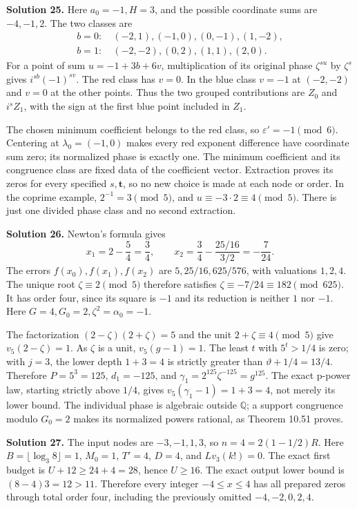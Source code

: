 \documentclass[
  11pt,
  a4paper,
]{article}
\begin{document}
\textbf{Solution 25.} Here \(a_0=-1,H=3\), and the possible coordinate
sums are \(-4,-1,2\). The two classes are \[
\begin{aligned}
b=0:\ &(-2,1),(-1,0),(0,-1),(1,-2),\\
b=1:\ &(-2,-2),(0,2),(1,1),(2,0).
\end{aligned}
\] For a point of sum \(u=-1+3b+6v\), multiplication of its original
phase \(\zeta^{su}\) by \(\zeta^s\) gives \(i^{sb}(-1)^{sv}\). The red
class has \(v=0\). In the blue class \(v=-1\) at \((-2,-2)\) and \(v=0\)
at the other points. Thus the two grouped contributions are \(Z_0\) and
\(i^sZ_1\), with the sign at the first blue point included in \(Z_1\).

The chosen minimum coefficient belongs to the red class, so
\(\varepsilon'=-1\pmod6\). Centering at \(\lambda_0=(-1,0)\) makes every
red exponent difference have coordinate sum zero; its normalized phase
is exactly one. The minimum coefficient and its congruence class are
fixed data of the coefficient vector. Extraction proves its zeros for
every specified \(s,\boldsymbol t\), so no new choice is made at each
node or order. In the coprime example, \(2^{-1}=3\pmod5\), and
\(u\equiv-3\cdot2\equiv4\pmod5\). There is just one divided phase class
and no second extraction.

\textbf{Solution 26.} Newton's formula gives \[
x_1=2-\frac5{4}=\frac34,\qquad
x_2=\frac34-\frac{25/16}{3/2}=-\frac7{24}.
\] The errors \(f(x_0),f(x_1),f(x_2)\) are \(5,25/16,625/576\), with
valuations \(1,2,4\). The unique root \(\zeta\equiv2\pmod5\) therefore
satisfies \(\zeta\equiv-7/24\equiv182\pmod{625}\). It has order four,
since its square is \(-1\) and its reduction is neither \(1\) nor
\(-1\). Here \(G=4,G_0=2,\zeta^2=\alpha_0=-1\).

The factorization \((2-\zeta)(2+\zeta)=5\) and the unit
\(2+\zeta\equiv4\pmod5\) give \(v_5(2-\zeta)=1\). As \(\zeta\) is a
unit, \(v_5(g-1)=1\). The least \(t\) with \(5^t>1/4\) is zero; with
\(j=3\), the lower depth \(1+3=4\) is strictly greater than
\(\vartheta+1/4=13/4\). Therefore \(P=5^3=125\), \(d_1=-125\), and
\(\gamma_1=2^{125}\zeta^{-125}=g^{125}\). The exact p-power law,
starting strictly above \(1/4\), gives \(v_5(\gamma_1-1)=1+3=4\), not
merely its lower bound. The individual phase is algebraic outside
\(\mathbb Q\); a support congruence modulo \(G_0=2\) makes its
normalized powers rational, as Theorem 10.51 proves.

\textbf{Solution 27.} The input nodes are \(-3,-1,1,3\), so
\(n=4=2(1-1/2)R\). Here \(B=\lfloor\log_3 8\rfloor=1\), \(M_0=1\),
\(T'=4\), \(D=4\), and \(Lv_3(k!)=0\). The exact first budget is
\(U+12\ge24+4=28\), hence \(U\ge16\). The exact output lower bound is
\((8-4)3=12>11\). Therefore every integer \(-4\le x\le4\) has all
prepared zeros through total order four, including the previously
omitted \(-4,-2,0,2,4\).
\end{document}
